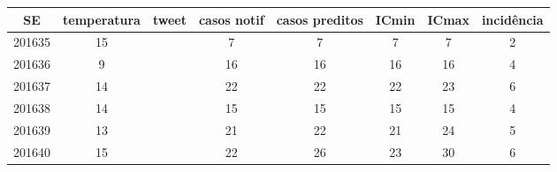 \begin{tabular}{c|ccccccc}
  \hline
SE & temperatura & tweet & casos notif & casos preditos & ICmin & ICmax & incidência \\ 
  \hline
201635 & 15 &  & 7 & 7 & 7 & 7 & 2 \\ 
  201636 & 9 &  & 16 & 16 & 16 & 16 & 4 \\ 
  201637 & 14 &  & 22 & 22 & 22 & 23 & 6 \\ 
  201638 & 14 &  & 15 & 15 & 15 & 15 & 4 \\ 
  201639 & 13 &  & 21 & 22 & 21 & 24 & 5 \\ 
  201640 & 15 &  & 22 & 26 & 23 & 30 & 6 \\ 
   \hline
\end{tabular}
